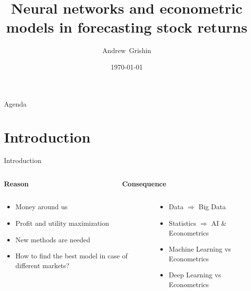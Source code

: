\documentclass[11pt, aspectratio= 169]{beamer}
\title[Stock returns forecasting]{Neural networks and econometric models in forecasting stock returns}
\author{Andrew~Grishin}
\institute[Faculty of Economics MSU]{Faculty of Economics Moscow State University}
\date{\today}
\begin{document}
	\begin{frame}
		\maketitle
	\end{frame}
	
	\begin{frame}{Agenda}
		\tableofcontents
	\end{frame}
	
	\section{Introduction}
	\begin{frame}{Introduction}
		\begin{columns}
			\begin{column}{0.5\textwidth}
				\centering
				\begin{LARGE}
					\textbf{Reason}
				\end{LARGE}
			\end{column}
			\begin{column}{0.5\textwidth}
				\centering
				\begin{LARGE}
					\textbf{Consequence}
				\end{LARGE}
			\end{column}
		\end{columns}
		\vspace{0.3cm}
		\begin{columns}
			\begin{column}{0.5\textwidth}
				\large
				\begin{itemize}
					\item Money around us
					\item Profit and utility maximization
					\item New methods are needed
					\item How to find the best model in case of different markets?
				\end{itemize}
			\end{column}
			\hspace{0.5cm}
			\begin{column}{0.5\textwidth}
				\large
				\begin{itemize}
					\item Data $\Rightarrow$ Big Data
					\item Statistics $\Rightarrow$ AI \& Econometrics
					\item Machine Learning vs Econometrics
					\item Deep Learning vs Econometrics
				\end{itemize}
			\end{column}
		\end{columns}
	\end{frame}
	
\end{document}
